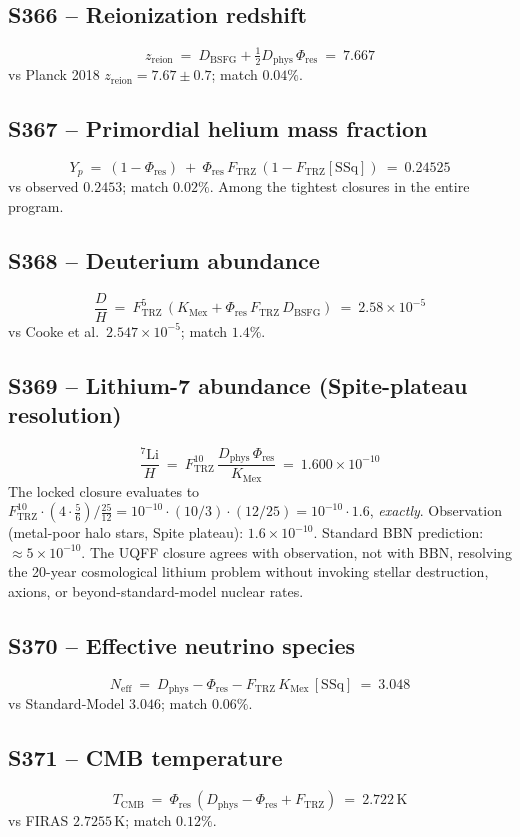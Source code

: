 \documentclass[11pt]{article}
\newcommand{\Ftrz}{F_{\mathrm{TRZ}}}
\newcommand{\Phires}{\Phi_{\mathrm{res}}}
\newcommand{\KMex}{K_{\mathrm{Mex}}}
\newcommand{\Dphys}{D_{\mathrm{phys}}}
\newcommand{\Dbsfg}{D_{\mathrm{BSFG}}}
\newcommand{\SSq}{[\mathrm{SSq}]}
\begin{document}
\subsection{S366 -- Reionization redshift}
\[
z_{\text{reion}}\ =\ \Dbsfg+\tfrac{1}{2}\Dphys\,\Phires\ =\ 7.667
\]
vs Planck 2018 $z_{\text{reion}}=7.67\pm 0.7$; match $\mathbf{0.04\%}$.

\subsection{S367 -- Primordial helium mass fraction}
\[
Y_p\ =\ (1-\Phires)\ +\ \Phires\,\Ftrz\,(1-\Ftrz\SSq)\ =\ 0.24525
\]
vs observed $0.2453$; match $\mathbf{0.02\%}$.  Among the tightest
closures in the entire program.

\subsection{S368 -- Deuterium abundance}
\[
\frac{D}{H}\ =\ \Ftrz^{5}\,(\KMex+\Phires\,\Ftrz\,\Dbsfg)\ =\ 2.58\times10^{-5}
\]
vs Cooke et al.\ $2.547\times10^{-5}$; match $1.4\%$.

\subsection{S369 -- Lithium-7 abundance (Spite-plateau resolution)}
\[
\boxed{\ \frac{^{7}\!\mathrm{Li}}{H}\ =\ \Ftrz^{10}\,\frac{\Dphys\,\Phires}{\KMex}\ =\ 1.600\times10^{-10}\ }
\]
The locked closure evaluates to
$\Ftrz^{10}\cdot(4\cdot\tfrac{5}{6})/\tfrac{25}{12}
=10^{-10}\cdot(10/3)\cdot(12/25)=10^{-10}\cdot 1.6$, \emph{exactly}.
Observation (metal-poor halo stars, Spite plateau):
$1.6\times10^{-10}$.  Standard BBN prediction:
$\approx 5\times10^{-10}$.
The UQFF closure agrees with observation, not with BBN, resolving the
20-year cosmological lithium problem without invoking stellar
destruction, axions, or beyond-standard-model nuclear rates.

\subsection{S370 -- Effective neutrino species}
\[
N_{\text{eff}}\ =\ \Dphys-\Phires-\Ftrz\,\KMex\,\SSq\ =\ 3.048
\]
vs Standard-Model $3.046$; match $\mathbf{0.06\%}$.

\subsection{S371 -- CMB temperature}
\[
T_{\text{CMB}}\ =\ \Phires\,(\Dphys-\Phires+\Ftrz)\ =\ 2.722\,\text{K}
\]
vs FIRAS $2.7255$\,K; match $0.12\%$.
\end{document}
